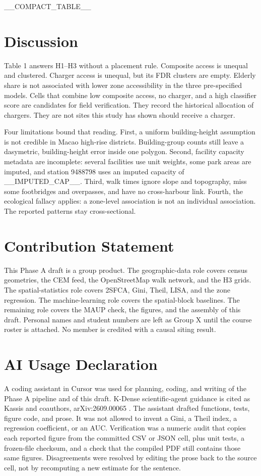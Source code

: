 \documentclass[11pt,a4paper]{article}
\newcommand{\mfourpad}{__PAD_PT__pt}
\begin{document}
__COMPACT_TABLE__

\section{Discussion}
Table 1 answers H1--H3 without a placement rule. Composite access is unequal and clustered. Charger access is unequal, but its FDR clusters are empty. Elderly share is not associated with lower zone accessibility in the three pre-specified models. Cells that combine low composite access, no charger, and a high classifier score are candidates for field verification. They record the historical allocation of chargers. They are not sites this study has shown should receive a charger.

Four limitations bound that reading. First, a uniform building-height assumption is not credible in Macao high-rise districts. Building-group counts still leave a dasymetric, building-height error inside one polygon. Second, facility capacity metadata are incomplete: several facilities use unit weights, some park areas are imputed, and station 9488798 uses an imputed capacity of __IMPUTED_CAP__. Third, walk times ignore slope and topography, miss some footbridges and overpasses, and have no cross-harbour link. Fourth, the ecological fallacy applies: a zone-level association is not an individual association. The reported patterns stay cross-sectional.

\vspace*{\mfourpad}




\section*{Contribution Statement}
This Phase A draft is a group product. The geographic-data role covers census geometries, the CEM feed, the OpenStreetMap walk network, and the H3 grids. The spatial-statistics role covers 2SFCA, Gini, Theil, LISA, and the zone regression. The machine-learning role covers the spatial-block baselines. The remaining role covers the MAUP check, the figures, and the assembly of this draft. Personal names and student numbers are left as Group X until the course roster is attached. No member is credited with a causal siting result.

\section*{AI Usage Declaration}
A coding assistant in Cursor was used for planning, coding, and writing of the Phase A pipeline and of this draft. K-Dense scientific-agent guidance is cited as Kassis and coauthors, arXiv:2609.00065 \citep{kassis2026}. The assistant drafted functions, tests, figure code, and prose. It was not allowed to invent a Gini, a Theil index, a regression coefficient, or an AUC. Verification was a numeric audit that copies each reported figure from the committed CSV or JSON cell, plus unit tests, a frozen-file checksum, and a check that the compiled PDF still contains those same figures. Disagreements were resolved by editing the prose back to the source cell, not by recomputing a new estimate for the sentence.
\end{document}
